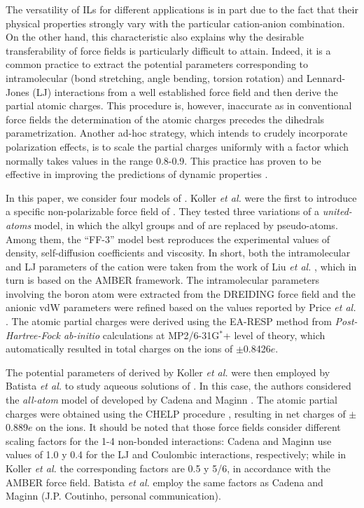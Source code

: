 \documentclass[3p,twocolumn]{elsarticle}
\begin{document}
The versatility of ILs for different applications is in part due to the fact that their physical properties strongly vary with the particular cation-anion combination. On the other hand, this characteristic also explains why the desirable transferability of force fields is particularly difficult to attain. Indeed, it is a common practice to extract the potential parameters corresponding to intramolecular (bond stretching, angle bending, torsion rotation) and Lennard-Jones (LJ) interactions from a well established force field and then derive the partial atomic charges. This procedure is, however, inaccurate as in conventional force fields the determination of the atomic charges precedes the dihedrals parametrization. Another ad-hoc strategy, which intends to crudely incorporate polarization effects, is to scale the partial charges uniformly with a factor which normally takes values in the range 0.8-0.9. This practice has proven to be effective in improving the predictions of dynamic properties \cite{Schr_der_2012}.

In this paper, we consider four models of \ce{[emim][B(CN)_4]}. Koller \textit{et al.} \cite{Koller_2012} were the first to introduce a specific non-polarizable force field of \ce{[emim][B(CN)_4]}. They tested three variations of a \textit{united-atoms} model, in which the alkyl groups  and  of \ce{[emim]^+} are replaced by pseudo-atoms. Among them, the ``FF-3'' model best reproduces the experimental values of density, self-diffusion coefficients and viscosity. In short, both the intramolecular and LJ parameters of the cation were taken from the work of Liu \textit{et al.} \cite{Liu_2006}, which in turn is based on the AMBER \cite{Cornell_1995} framework. The intramolecular parameters involving the boron atom were extracted from the DREIDING \cite{Mayo_1990} force field and the anionic vdW parameters were refined based on the values reported by Price \textit{et al.} \cite{Price_2001}. The atomic partial charges were derived using the EA-RESP method \cite{Basma_2001} from \textit{Post-Hartree-Fock ab-initio} calculations at MP2/6-31G$^\ast$+ level of theory, which automatically resulted in total charges on the ions of $\pm$0.8426$e$. 

The potential parameters of \ce{[B(CN)_4]^-} derived by Koller \textit{et al.} \cite{Koller_2012} were then employed by Batista \textit{et al.} \cite{Batista_2015} to study aqueous solutions of \ce{[emim][B(CN)_4]}. In this case, the authors considered the \textit{all-atom} model of \ce{[emim]^+} developed by Cadena and Maginn \cite{Cadena_2006}. The atomic partial charges were obtained using the CHELP procedure \cite{Breneman_1990}, resulting in net charges of $\pm$0.889$e$ on the ions. It should be noted that those force fields consider different scaling factors for the 1-4 non-bonded interactions: Cadena and Maginn \cite{Cadena_2006} use values of 1.0 y 0.4 for the LJ and Coulombic interactions, respectively; while in Koller \textit{et al.} \cite{Koller_2012} the corresponding factors are 0.5 y 5/6, in accordance with the AMBER force field. Batista \textit{et al.} \cite{Batista_2015} employ the same factors as Cadena and Maginn \cite{Cadena_2006} (J.P. Coutinho, personal communication).
\end{document}
